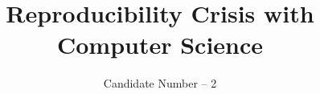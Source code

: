 \documentclass[acmlarge,12pt]{acmart}
\begin{document}
\title{Reproducibility Crisis with Computer Science}

\author{Candidate Number -- 2}
\orcid{}


%
%

%
%


\maketitle



\end{document}
